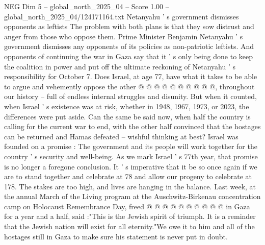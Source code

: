 \begin{textsample}{NEG Dim 5 – global\_north\_2025\_04 – Score 1.00 – global\_north\_2025\_04/124171164.txt}
Netanyahu ' s government dismisses opponents as leftists The problem with both plans is that they sow distrust and anger from those who oppose them.
Prime Minister Benjamin Netanyahu ' s government dismisses any opponents of its policies as non-patriotic leftists.
And opponents of continuing the war in Gaza say that it ' s only being done to keep the coalition in power and put off the ultimate reckoning of Netanyahu ' s responsibility for October 7.
Does Israel, at age 77, have what it takes to be able to argue and vehemently oppose the other @ @ @ @ @ @ @ @ @ @, throughout our history -- full of endless internal struggles and disunity.
But when it counted, when Israel ' s existence was at risk, whether in 1948, 1967, 1973, or 2023, the differences were put aside.
Can the same be said now, when half the country is calling for the current war to end, with the other half convinced that the hostages can be returned and Hamas defeated -- wishful thinking at best?
Israel was founded on a promise : The government and its people will work together for the country ' s security and well-being.
As we mark Israel ' s 77th year, that promise is no longer a foregone conclusion.
It ' s imperative that it be so once again if we are to stand together and celebrate at 78 and allow our progeny to celebrate at 178.
The stakes are too high, and lives are hanging in the balance.
Last week, at the annual March of the Living program at the Auschwitz-Birkenau concentration camp on Holocaust Remembrance Day, freed @ @ @ @ @ @ @ @ @ @ in Gaza for a year and a half, said :"This is the Jewish spirit of triumph.
It is a reminder that the Jewish nation will exist for all eternity."We owe it to him and all of the hostages still in Gaza to make sure his statement is never put in doubt.

\end{textsample}
